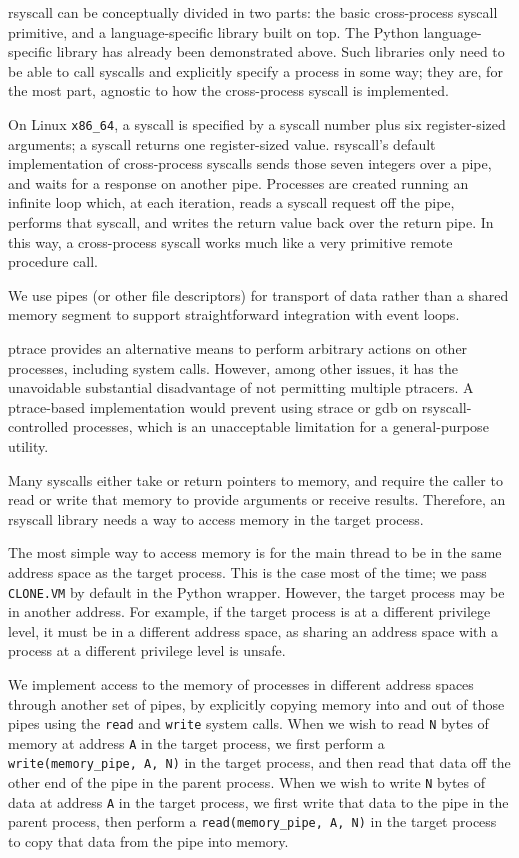 \documentclass[sigplan]{acmart}
\begin{document}
rsyscall can be conceptually divided in two parts:
the basic cross-process syscall primitive,
and a language-specific library built on top.
The Python language-specific library has already been demonstrated above.
Such libraries only need to be able to call syscalls and explicitly specify a process in some way;
they are, for the most part, agnostic to how the cross-process syscall is implemented.

On Linux \verb|x86_64|, a syscall is specified by a syscall number plus six register-sized arguments;
a syscall returns one register-sized value.
rsyscall's default implementation of cross-process syscalls sends those seven integers over a pipe,
and waits for a response on another pipe.
Processes are created running an infinite loop which, at each iteration,
reads a syscall request off the pipe,
performs that syscall,
and writes the return value back over the return pipe.
In this way, a cross-process syscall works much like a very primitive remote procedure call.

We use pipes (or other file descriptors) for transport of data rather than a shared memory segment
to support straightforward integration with event loops.

ptrace provides an alternative means to perform arbitrary actions on other processes,
including system calls.
However, among other issues, it has the unavoidable substantial disadvantage of not permitting multiple ptracers.
A ptrace-based implementation would prevent using strace or gdb on rsyscall-controlled processes,
which is an unacceptable limitation for a general-purpose utility.

Many syscalls either take or return pointers to memory,
and require the caller to read or write that memory to provide arguments or receive results.
Therefore, an rsyscall library needs a way to access memory in the target process.

The most simple way to access memory is for the main thread to be in the same address space as the target process.
This is the case most of the time; we pass \texttt{CLONE.VM} by default in the Python wrapper.
However, the target process may be in another address.
For example, if the target process is at a different privilege level,
it must be in a different address space,
as sharing an address space with a process at a different privilege level is unsafe.

We implement access to the memory of processes in different address spaces through another set of pipes,
by explicitly copying memory into and out of those pipes using the \texttt{read} and \texttt{write} system calls.
When we wish to read \texttt{N} bytes of memory at address \texttt{A} in the target process,
we first perform a \verb|write(memory_pipe, A, N)| in the target process,
and then read that data off the other end of the pipe in the parent process.
When we wish to write \texttt{N} bytes of data at address \texttt{A} in the target process,
we first write that data to the pipe in the parent process,
then perform a \verb|read(memory_pipe, A, N)| in the target process to copy that data from the pipe into memory.
\end{document}
